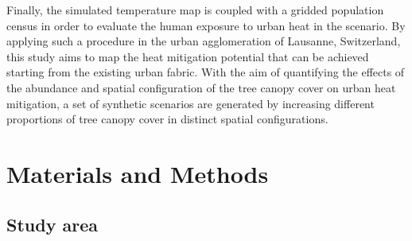 \documentclass[10pt,letterpaper]{article}
\begin{document}
Finally, the simulated temperature map is coupled with a gridded population census in order to evaluate the human exposure to urban heat in the scenario.
By applying such a procedure in the urban agglomeration of Lausanne, Switzerland, this study aims to map the heat mitigation potential that can be achieved starting from the existing urban fabric.
With the aim of quantifying the effects of the abundance and spatial configuration of the tree canopy cover on urban heat mitigation, a set of synthetic scenarios are generated by increasing different proportions of tree canopy cover in distinct spatial configurations. %

\section*{Materials and Methods}

\subsection*{Study area}
\end{document}
